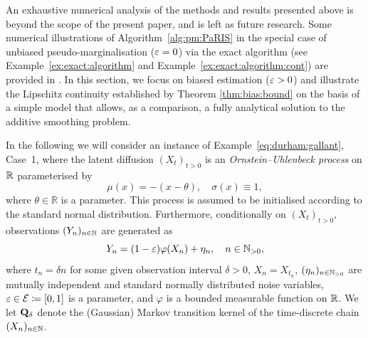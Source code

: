 
An exhaustive numerical analysis of the methods and results presented above is beyond the scope of the present paper, and is left as future research. Some numerical illustrations of Algorithm~\ref{alg:pm:PaRIS} in the special case of unbiased pseudo-marginalisation ($\varepsilon = 0$) via the exact algorithm (see Example~\ref{ex:exact:algorithm} and Example~\ref{ex:exact:algorithm:cont}) are provided in \cite{gloaguen2018online}. In this section, we focus on biased estimation ($\varepsilon > 0$) and illustrate the Lipschitz continuity established by Theorem \ref{thm:bias:bound} on the basis of a simple model that allows, as a comparison, a fully analytical solution to the additive smoothing problem.
 
In the following we will consider an instance of Example~\ref{eq:durham:gallant}, Case~1, where the latent diffusion $(X_t)_{t > 0}$ is an \emph{Ornstein--Uhlenbeck process} \cite{uhlenbeck1930theory} on $\mathbb{R}$ parameterised by
$$
\mu(x) = - (x - \theta), \quad \sigma(x) \equiv 1,
$$
where $\theta \in \mathbb{R}$ is a parameter.
This process is assumed to be initialised according to the standard normal distribution. Furthermore, conditionally on $(X_t)_{t > 0}$, observations $(Y_n)_{n \in \mathbb{N}}$ are generated as
$$
Y_n = (1 - \varepsilon) \varphi(X_n) + \eta_n, \quad n \in \mathbb{N}_{> 0},
$$
where $t_n = \delta n$ for some given observation interval $\delta > 0$, $X_n = X_{t_n}$, $(\eta_n)_{n \in \mathbb{N}_{> 0}}$ are mutually independent and standard normally distributed noise variables, $\varepsilon \in \mathcal{E} \coloneqq [0, 1]$ is a parameter, and $\varphi$ is a bounded measurable function on $\mathbb{R}$. We let $\mathbf{Q}_\delta$ denote the (Gaussian) Markov transition kernel of the time-discrete chain $(X_n)_{n \in \mathbb{N}}$. 

